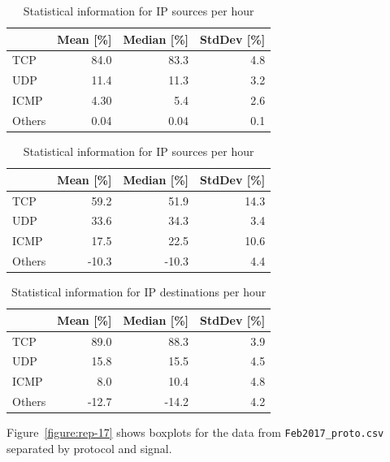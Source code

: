 \documentclass{article}
\begin{document}
\begin{table}[H]
    \parbox{.45\linewidth}{
        \centering
        \begin{tabular}{l|r|r|r}
                & Mean [\%]  & Median [\%] & StdDev [\%] \\
                   \hline
            TCP    & 84.0 & 83.3  & 4.8 \\
            UDP    & 11.4 & 11.3  & 3.2 \\
            ICMP   & 4.30 & 5.4  & 2.6 \\
            Others & 0.04 & 0.04  & 0.1 \\
        \end{tabular}
        \caption{\label{table:rep-17-packets} Statistical information for Packets per hour}
    }
    \parbox{.1\linewidth}{}
    \parbox{.45\linewidth}{
        \centering
        \begin{tabular}{l|r|r|r}
                   & Mean [\%]  & Median [\%] & StdDev [\%] \\
                   \hline
            TCP    &   59.2 & 51.9  & 14.3  \\
            UDP    &   33.6 & 34.3  & 3.4  \\
            ICMP   &   17.5 & 22.5  & 10.6  \\
            Others &  -10.3 & -10.3 & 4.4  \\
        \end{tabular}
        \caption{\label{table:rep-17-ips} Statistical information for IP sources per hour}
    }
\end{table}

\begin{table}[H]
    \centering
    \begin{tabular}{l|r|r|r}
               & Mean  [\%] & Median [\%] & StdDev [\%] \\
               \hline
        TCP    &  89.0 & 88.3&  3.9   \\
        UDP    &  15.8 & 15.5&  4.5   \\
        ICMP   &  8.0 & 10.4&  4.8   \\
        Others &  -12.7&  -14.2&  4.2 \\
    \end{tabular}
    \caption{\label{table:rep-17-ipd} Statistical information for IP destinations per hour}
\end{table}

Figure~\ref{figure:rep-17} shows
boxplots for the data from \texttt{Feb2017\_proto.csv} separated by protocol and signal.
\end{document}

